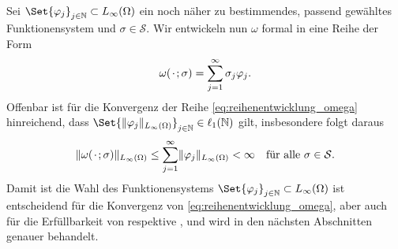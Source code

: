 Sei $\Set{ \varphi_{j} }_{j \in \mathbb{N}} \subset L_{\infty}(\Omega)$ ein noch näher zu bestimmendes, passend gewähltes Funktionensystem und $\sigma \in \mathcal S$.
Wir entwickeln nun $\omega$ formal in eine Reihe der Form
\begin{equation}
    \label{eq:reihenentwicklung_omega}
    \omega(\blank; \sigma) = \sum_{j = 1}^{\infty} \sigma_{j} \varphi_{j}.
\end{equation}
Offenbar ist für die Konvergenz der Reihe \eqref{eq:reihenentwicklung_omega} hinreichend, dass $\Set{ \norm{\varphi_{j}}_{L_{\infty}(\Omega)} }_{j \in \mathbb{N}} \in \ell_{1}(\mathbb{N})$ gilt, insbesondere folgt daraus
\begin{equation}
    \norm{\omega(\blank; \sigma)}_{L_{\infty}(\Omega)} \leq \sum_{j = 1}^{\infty} \norm{\varphi_{j}}_{L_{\infty}(\Omega)} < \infty \quad \fa \sigma \in \mathcal S.
\end{equation}
Damit ist die Wahl des Funktionensystems $\Set{ \varphi_{j} }_{j \in \mathbb{N}} \subset L_{\infty}(\Omega)$ ist entscheidend für die Konvergenz von \eqref{eq:reihenentwicklung_omega}, aber auch für die Erfüllbarkeit von  respektive ,
und wird in den nächsten Abschnitten genauer behandelt.


